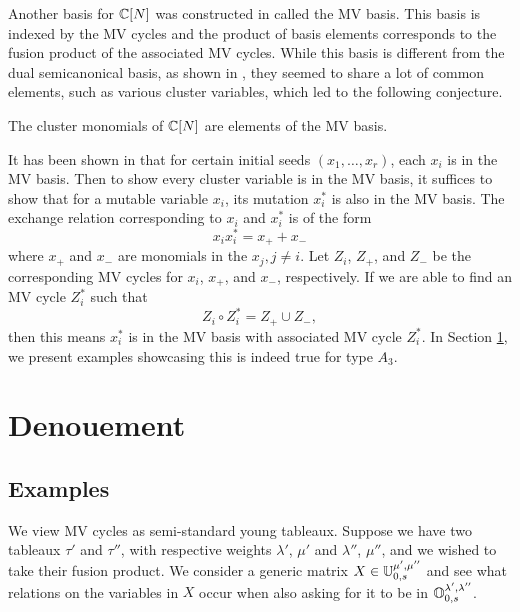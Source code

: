 \documentclass[draft]{article}
\begin{document}
Another basis for $\mathbb C[N]$ was constructed in \cite{mirkovic2007geometric} called the MV basis. This basis is indexed by the MV cycles and the product of basis elements corresponds to the fusion product of the associated MV cycles. While this basis is different from the dual semicanonical basis, as shown in \cite{baumann2019mirkovic}, they seemed to share a lot of common elements, such as various cluster variables, which led to the following conjecture.

\begin{conjecture}
    The cluster monomials of $\mathbb C[N]$ are elements of the MV basis.
\end{conjecture}

It has been shown in \cite{kato2011polytopal} that for certain initial seeds $(x_1, \dots, x_r)$, each $x_i$ is in the MV basis. Then to show every cluster variable is in the MV basis, it suffices to show that for a mutable variable $x_i$, its mutation $x_i^*$ is also in the MV basis. The exchange relation corresponding to $x_i$ and $x_i^*$ is of the form
$$x_ix_i^* = x_+ + x_-$$
where $x_+$ and $x_-$ are monomials in the $x_j,j\neq i$. Let $Z_i$, $Z_+$, and $Z_-$ be the corresponding MV cycles for $x_i$, $x_+$, and $x_-$, respectively. If we are able to find an MV cycle $Z_i^*$ such that
$$Z_i \circ Z_i^* = Z_+ \cup Z_-,$$
then this means $x_i^*$ is in the MV basis with associated MV cycle $Z_i^*$. In Section \ref{s:denouement}, we present examples showcasing this is indeed true for type $A_3$. 
\section{Denouement}
\label{s:denouement}
\subsection{Examples}


We view MV cycles as semi-standard young tableaux. Suppose we have two tableaux $\tau'$ and $\tau''$, with respective weights $\lambda'$, $\mu'$ and $\lambda''$, $\mu''$, and we wished to take their fusion product. We consider a generic matrix $X \in \mathbb U^{\mu',\mu''}_{0,s}$ and see what relations on the variables in $X$ occur when also asking for it to be in $\mathbb O^{\lambda',\lambda''}_{0,s}$. 
\end{document}
